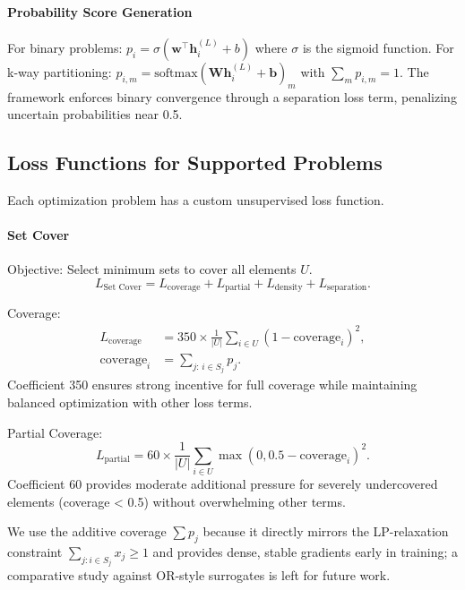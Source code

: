 \documentclass[conference]{IEEEtran}
\begin{document}
\paragraph{Probability Score Generation}
For binary problems: \(p_i = \sigma(\mathbf{w}^\top \mathbf{h}_i^{(L)} + b)\) where \(\sigma\) is the sigmoid function.
For k-way partitioning: \(p_{i,m} = \text{softmax}(\mathbf{W} \mathbf{h}_i^{(L)} + \mathbf{b})_m\) with \(\sum_m p_{i,m} = 1\).
The framework enforces binary convergence through a separation loss term, penalizing uncertain probabilities near 0.5.

\subsection{Loss Functions for Supported Problems}
Each optimization problem has a custom unsupervised loss function.

\paragraph{Set Cover}
Objective: Select minimum sets to cover all elements \(U\).
\begin{equation}
L_{\text{Set Cover}} = L_{\text{coverage}} + L_{\text{partial}} + L_{\text{density}} + L_{\text{separation}}.
\end{equation}

Coverage:
\begin{align}
L_{\text{coverage}} &= 350 \times \frac{1}{|U|} \sum_{i \in U} (1 - \mathrm{coverage}_i)^2, \\
\mathrm{coverage}_i &= \sum_{j:\, i \in S_j} p_j.
\end{align}
Coefficient 350 ensures strong incentive for full coverage while maintaining balanced optimization with other loss terms.

Partial Coverage:
\begin{equation}
L_{\text{partial}} = 60 \times \frac{1}{|U|} \sum_{i \in U} \max(0, 0.5 - \mathrm{coverage}_i)^2.
\end{equation}
Coefficient 60 provides moderate additional pressure for severely undercovered elements (coverage < 0.5) without overwhelming other terms.

We use the additive coverage \(\sum p_j\) because it directly mirrors the LP-relaxation constraint \(\sum_{j:i\in S_j} x_j \ge 1\) and provides dense, stable gradients early in training; a comparative study against OR-style surrogates is left for future work.
\end{document}
